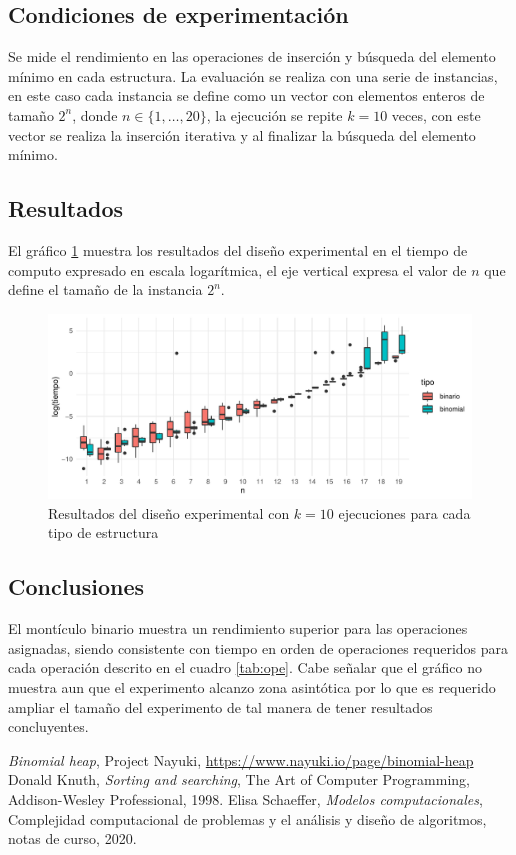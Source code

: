 \documentclass[letterpaper,11pt]{article}
\begin{document}
\subsection{Condiciones de experimentación}
Se mide el rendimiento en las operaciones de inserción y búsqueda del elemento mínimo en cada estructura. La evaluación se realiza con una serie de instancias, en este caso cada instancia se define como un vector con elementos enteros de tamaño ${2^n}$, donde $n\in \{1,\dots,20\}$, la ejecución se repite $k=10$ veces, con este vector se realiza la inserción iterativa y al finalizar la búsqueda del elemento mínimo.

\subsection{Resultados}
El gráfico \ref{fig:bs} muestra los resultados del diseño experimental en el tiempo de computo expresado en escala logarítmica, el eje vertical expresa el valor de $n$ que define el tamaño de la instancia ${2^n}$. 

\begin{figure}[h]
 \centering
  \includegraphics[width=11.5cm]{img/A9_boxplot.pdf}
  \caption{Resultados del diseño experimental con $k=10$ ejecuciones para cada tipo de estructura}
  \label{fig:bs}
\end{figure}

\subsection{Conclusiones}

El montículo binario muestra un rendimiento superior para las operaciones asignadas, siendo consistente con tiempo en orden de operaciones requeridos para cada operación descrito en el cuadro \ref{tab:ope}. Cabe señalar que el gráfico no muestra aun que el experimento alcanzo zona asintótica por lo que es requerido ampliar el tamaño del experimento de tal manera de tener resultados concluyentes.


\begin{thebibliography}{0}
   \textit{Binomial heap},  Project Nayuki, \url{https://www.nayuki.io/page/binomial-heap} 
   Donald Knuth, \textit{Sorting and searching}, The Art of Computer Programming, Addison-Wesley Professional, 1998.
   Elisa Schaeffer, \textit{Modelos computacionales}, Complejidad computacional de problemas y el análisis y diseño de algoritmos, notas de curso, 2020.
\end{thebibliography}
\end{document}
